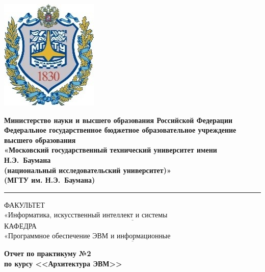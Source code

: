 
\begin{titlepage}
	\fontsize{12pt}{12pt}\selectfont
	\noindent \begin{minipage}{0.15\textwidth}
		\includegraphics[scale=0.15]{inc/img/bmstu}
	\end{minipage}
	\noindent\begin{minipage}{0.9\textwidth}\centering
		\textbf{Министерство науки и высшего образования Российской Федерации}\\
		\textbf{Федеральное государственное бюджетное образовательное учреждение высшего образования}\\
		\textbf{«Московский государственный технический университет имени Н.Э.~Баумана}\\
		\textbf{(национальный исследовательский университет)»}\\
		\textbf{(МГТУ им. Н.Э.~Баумана)}
	\end{minipage}
	
	\noindent\rule{18cm}{3pt}
	\newline\newline
	\noindent ФАКУЛЬТЕТ $\underline{\text{«Информатика, искусственный интеллект и системы управления»~~~~~~~~~~~~~~~~~~~~~~~~~~~~~~~~~~~}}$ \newline\newline
	\noindent КАФЕДРА $\underline{\text{«Программное обеспечение ЭВМ и информационные технологии»~~~~~~~~~~~~~~~~~~~~~~~~~~~~~~~~~~~~~~}}$\newline\newline\newline\newline
	
	\vspace{2.5cm}
	\begin{center}
		\Large\textbf{Отчет по практикуму №2}\\
		\Large\textbf {по курсу <<Архитектура ЭВМ>>}\\
	\end{center}
	

\end{titlepage}
